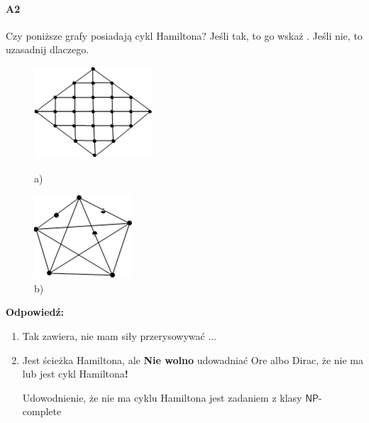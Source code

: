 \documentclass[a4paper,12pt]{article}
\theoremstyle{definition}%
\theoremstyle{definition}
\theoremstyle{problem}
\begin{document}
\paragraph{A2}  Czy poniższe grafy posiadają  cykl Hamiltona?  Jeśli tak, to go wskaż .  Jeśli nie, to uzasadnij dlaczego.
\begin{figure}[H]
\centering
\begin{minipage}{.5\textwidth}
\centering
\includegraphics[width=.5\linewidth]{img/g2}
\caption*{a)}
\end{minipage}%
\begin{minipage}{.5\textwidth}
\centering
\includegraphics[width=.5\linewidth]{img/g3}
\caption*{b)}
\end{minipage}
\end{figure}

\textbf{Odpowiedź:}
\begin{enumerate}[label=\alph*)]
\item Tak zawiera, nie mam siły przerysowywać ...
\item Jest ścieżka Hamiltona, ale \textbf{Nie wolno} udowadniać Ore albo Dirac, że nie ma lub jest cykl Hamiltona\textbf{!}

Udowodnienie, że nie ma cyklu Hamiltona jest zadaniem z klasy $\mathsf{NP}$- complete
\end{enumerate}
\end{document}
